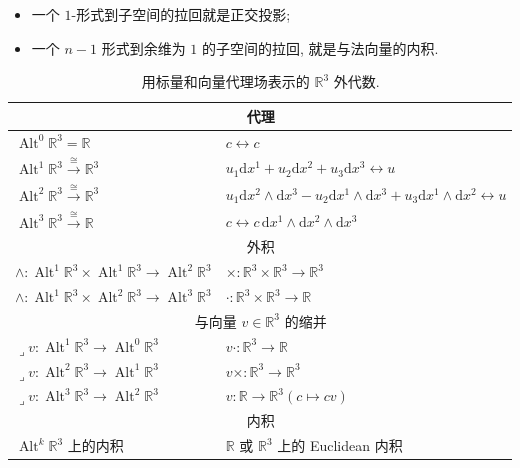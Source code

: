 \begin{itemize}
\item{一个 $1$-形式到子空间的拉回就是正交投影;}
\item{一个 $n-1$ 形式到余维为 $1$ 的子空间的拉回, 就是与法向量的内积.}
\end{itemize}

\begin{table}[htbp]\centering\footnotesize
\caption{用标量和向量代理场表示的 $\mathbb R^3$ 外代数.}\label{tab:exterior-algebra-r3}
\setlength{\tabcolsep}{4pt}
\begin{tabular}{l|l}\hline
\multicolumn{2}{c}{{代理}}\\\hline
$\operatorname{Alt}^0\mathbb R^3=\mathbb R$&$c\leftrightarrow c$\\
$\operatorname{Alt}^1\mathbb R^3\xrightarrow{\cong}\mathbb R^3$&$u_1\mathrm{d}x^1+u_2\mathrm{d}x^2+u_3\mathrm{d}x^3\leftrightarrow u$\\
$\operatorname{Alt}^2\mathbb R^3\xrightarrow{\cong}\mathbb R^3$&$u_1\mathrm{d}x^2\wedge \mathrm{d}x^3-u_2\mathrm{d}x^1\wedge \mathrm{d}x^3+u_3\mathrm{d}x^1\wedge \mathrm{d}x^2\leftrightarrow u$\\
$\operatorname{Alt}^3\mathbb R^3\xrightarrow{\cong}\mathbb R$&$c\leftrightarrow c\,\mathrm{d}x^1\wedge \mathrm{d}x^2\wedge \mathrm{d}x^3$\\\hline
\multicolumn{2}{c}{{外积}}\\\hline
$\wedge:\operatorname{Alt}^1\mathbb R^3\times\operatorname{Alt}^1\mathbb R^3\to\operatorname{Alt}^2\mathbb R^3$&$\times:\mathbb R^3\times\mathbb R^3\to\mathbb R^3$\\
$\wedge:\operatorname{Alt}^1\mathbb R^3\times\operatorname{Alt}^2\mathbb R^3\to\operatorname{Alt}^3\mathbb R^3$&$\cdot:\mathbb R^3\times\mathbb R^3\to\mathbb R$\\\hline
\multicolumn{2}{c}{{与向量 $v\in\mathbb R^3$ 的缩并}}\\\hline
$\lrcorner v:\operatorname{Alt}^1\mathbb R^3\to\operatorname{Alt}^0\mathbb R^3$&$v\cdot:\mathbb R^3\to\mathbb R$\\
$\lrcorner v:\operatorname{Alt}^2\mathbb R^3\to\operatorname{Alt}^1\mathbb R^3$&$v\times:\mathbb R^3\to\mathbb R^3$\\
$\lrcorner v:\operatorname{Alt}^3\mathbb R^3\to\operatorname{Alt}^2\mathbb R^3$&$v:\mathbb R\to\mathbb R^3$\quad$(c\mapsto cv)$\\\hline
\multicolumn{2}{c}{{内积}}\\\hline
$\operatorname{Alt}^k\mathbb R^3$ 上的内积&$\mathbb R$ 或 $\mathbb R^3$ 上的 Euclidean 内积\\\hline

\end{tabular}
\end{table}
